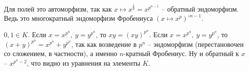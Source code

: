 	Для полей это автоморфизм, так как $x \mapsto x^{\frac{1}{p}} = x^{p^{n - 1}}$ -- обратный эндоморфизм. Ведь это многократный эндоморфизм Фробениуса $(x \mapsto x^p)^{\circ n - 1}$.
	\endproof

\elm

	
	\proof
	$0, 1 \in K$. Если $x = x^{p^n},\ y = y^{p^n}$, то $xy = (xy)^{p^n}$. Если $x = x^{p^n},\ y = y^{p^n}$, то $(x + y)^{p^n} = x^{p^n} + y^{p^n}$, так как возведение в $p^n$ -- эндоморфизм (перестановочен со сложением, в частности), а именно $n$-кратный Фробениус. Ну и обратный к $x$ -- $x^{p^n - 2}$, что видно из уравнения на элементы $K$.
	\endproof


\elm
